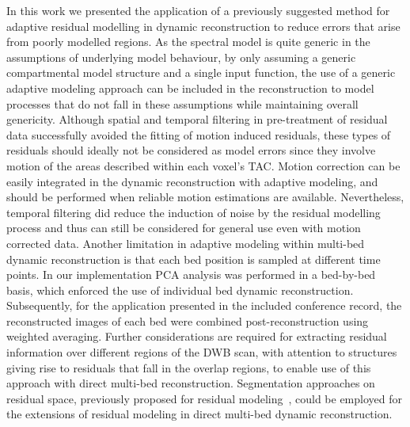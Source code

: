In this work we presented the application of a previously suggested method for adaptive residual modelling in dynamic reconstruction to reduce errors that arise from poorly modelled regions. As the spectral model is quite generic in the assumptions of underlying model behaviour, by only assuming a generic compartmental model structure and a single input function, the use of a generic adaptive modeling approach can be included in the reconstruction to model processes that do not fall in these assumptions while maintaining overall genericity. 
Although spatial and temporal filtering in pre-treatment of residual data successfully avoided the fitting of motion induced residuals, these types of residuals should ideally not be considered as model errors since they involve motion of the areas described within each voxel's TAC. Motion correction can be easily integrated in the dynamic reconstruction with adaptive modeling, and should be performed when reliable motion estimations are available. Nevertheless, temporal filtering did reduce the induction of noise by the residual modelling process and thus can still be considered for general use even with motion corrected data.
Another limitation in adaptive modeling within multi-bed dynamic reconstruction is that each bed position is sampled at different time points. In our implementation PCA analysis was performed in a bed-by-bed basis, which enforced the use of individual bed dynamic reconstruction. Subsequently, for the application presented in the included conference record, the reconstructed images of each bed were combined post-reconstruction using weighted averaging. Further considerations are required for extracting residual information over different regions of the DWB scan, with attention to structures giving rise to residuals that fall in the overlap regions, to enable use of this approach with direct multi-bed reconstruction. Segmentation approaches on residual space, previously proposed for residual modeling~\cite{Germino2016}, could be employed for the extensions of residual modeling in direct multi-bed dynamic reconstruction.

